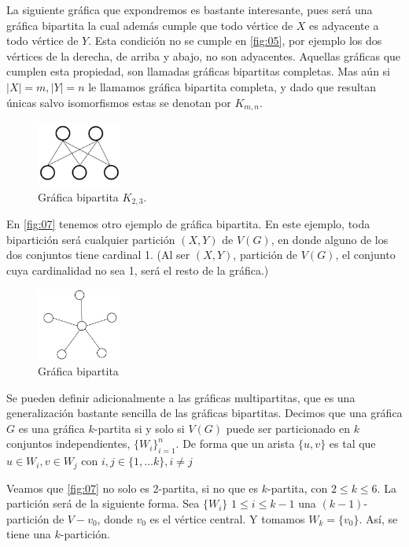 La siguiente gráfica que expondremos es bastante interesante, pues será una
gráfica bipartita la cual además cumple que todo vértice de $X$ es adyacente a
todo vértice de $Y$. Esta condición no se cumple en \cref{fig:05}, por ejemplo
los dos vértices de la derecha, de arriba y abajo, no son adyacentes. Aquellas
gráficas que cumplen esta propiedad, son llamadas gráficas bipartitas completas.
Mas aún si $|X| = m, |Y| = n $ le llamamos gráfica bipartita completa, y dado
que resultan \'unicas salvo isomorfismos estas se denotan por $K_{m,n}$.


\begin{figure}[H]
  \centering
  \includegraphics[width=0.25\textwidth]{recursos/capturas/06.jpg}
  \caption{Gráfica bipartita $K_{2,3}$.}
  \label{fig:11}
\end{figure}

En \cref{fig:07} tenemos otro ejemplo de gráfica bipartita. En este ejemplo,
toda bipartición será cualquier partición $(X,Y)$ de $V(G)$, en donde alguno de
los dos conjuntos tiene cardinal 1. (Al ser $(X,Y)$, partición de $V(G)$, el
conjunto cuya cardinalidad no sea 1, será el resto de la gráfica.)

\begin{figure}[H]
  \centering
  \includegraphics[width=0.25\textwidth]{recursos/capturas/07.jpg}
  \caption{Gráfica bipartita}
  \label{fig:12}
\end{figure}

Se pueden definir adicionalmente a las gráficas multipartitas, que es una
generalización bastante sencilla de las gráficas bipartitas. Decimos que una
gráfica $G$ es una gráfica $k$-partita si y solo si $V(G)$ puede ser
particionado en $k$ conjuntos independientes, $\{W_i\}_{i=1}^n$. De forma que un
arista $\{u,v\}$ es tal que $u\in W_i, v\in W_j$ con $i,j\in \{1, \dots k\},
i\neq j$ 

Veamos que \cref{fig:07} no solo es 2-partita, si no que es $k$-partita, con
$2\leq k \leq 6$. La partición será de la siguiente forma. Sea $\{W_i\}$ $1\leq
i\leq k-1$ una $(k-1)$-partición de $V-v_0$, donde $v_0 $ es el vértice central.
Y tomamos $W_k=\{v_0\}$. Así, se tiene una $k$-partición.

